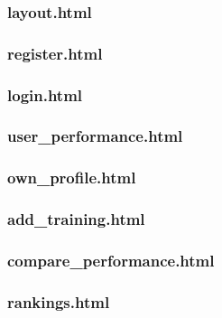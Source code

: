 \documentclass{article}[12pt,a4paper]
\begin{document}
\subsubsection{layout.html}


\subsubsection{register.html}


\subsubsection{login.html}


\subsubsection{user\_performance.html}


\subsubsection{own\_profile.html}


\subsubsection{add\_training.html}


\subsubsection{compare\_performance.html}


\subsubsection{rankings.html}

\end{document}
